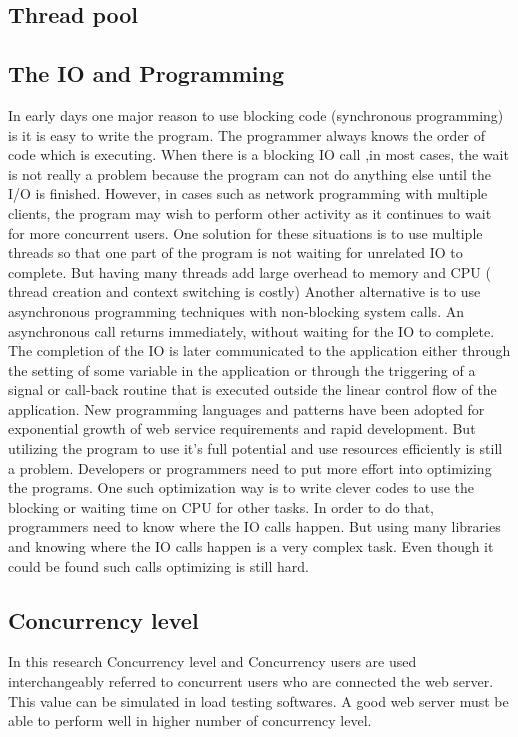 \subsection{Thread pool}

\subsection{The IO and Programming}

In early days one major reason to use blocking code (synchronous programming) is it is easy to write
the program. The programmer always knows the order of code which is executing. When there is a blocking IO call ,in most cases, the wait is not really a problem because the program can not do
anything else until the I/O is finished. However, in cases such as network programming with multiple
clients, the program may wish to perform other activity as it continues to wait for more concurrent
users.
One solution for these situations is to use multiple threads so that one part of the program is not
waiting for unrelated IO to complete. But having many threads add large overhead to memory and
CPU ( thread creation and context switching is costly)
Another alternative is to use asynchronous programming techniques with non-blocking system calls.
An asynchronous call returns immediately, without waiting for the IO to complete. The completion of
the IO is later communicated to the application either through the setting of some variable in the application or through the triggering of a signal or call-back routine that is executed outside the linear
control flow of the application.
New programming languages and patterns have been adopted for exponential growth of web service
requirements and rapid development. But utilizing the program to use it’s full potential and use
resources efficiently is still a problem. Developers or programmers need to put more effort into
optimizing the programs.
One such optimization way is to write clever codes to use the blocking or waiting time on CPU for
other tasks. In order to do that, programmers need to know where the IO calls happen. But using many
libraries and knowing where the IO calls happen is a very complex task. Even though it could be
found such calls optimizing is still hard.

\subsection{Concurrency level}

In this research Concurrency level and Concurrency users are used interchangeably referred to concurrent users who are connected the web server. This value can be  simulated in load testing softwares. A good web server must be able to perform well in higher number of concurrency level.

